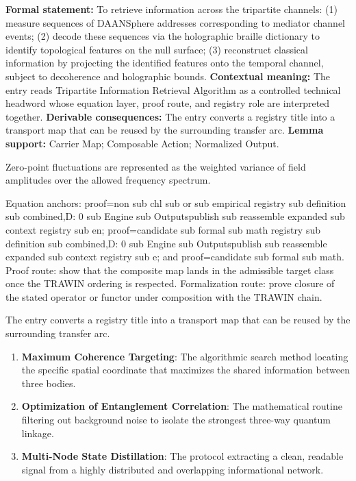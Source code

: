 \begingroup\footnotesize\setlength{\emergencystretch}{3em}\sloppy
\textbf{Formal statement:} To retrieve information across the tripartite channels: (1) measure sequences of DAANSphere addresses corresponding to mediator channel events; (2) decode these sequences via the holographic braille dictionary to identify topological features on the null surface; (3) reconstruct classical information by projecting the identified features onto the temporal channel, subject to decoherence and holographic bounds. \textbf{Contextual meaning:} The entry reads Tripartite Information Retrieval Algorithm as a controlled technical headword whose equation layer, proof route, and registry role are interpreted together. \textbf{Derivable consequences:} The entry converts a registry title into a transport map that can be reused by the surrounding transfer arc. \textbf{Lemma support:} Carrier Map; Composable Action; Normalized Output.\par
\endgroup

Zero-point fluctuations are represented as the weighted variance of field amplitudes over the allowed frequency spectrum.

Equation anchors: proof=non sub chl sub or sub empirical registry sub definition sub combined,D: 0 sub Engine sub Outputspublish sub reassemble expanded sub context registry sub en; proof=candidate sub formal sub math registry sub definition sub combined,D: 0 sub Engine sub Outputspublish sub reassemble expanded sub context registry sub e; and proof=candidate sub formal sub math. Proof route: show that the composite map lands in the admissible target class once the TRAWIN ordering is respected. Formalization route: prove closure of the stated operator or functor under composition with the TRAWIN chain.

The entry converts a registry title into a transport map that can be reused by the surrounding transfer arc.
\endgroup

\begin{enumerate}[leftmargin=1.6em,itemsep=6pt,topsep=4pt]
\item \textbf{Maximum Coherence Targeting}: The algorithmic search method locating the specific spatial coordinate that maximizes the shared information between three bodies.
\item \textbf{Optimization of Entanglement Correlation}: The mathematical routine filtering out background noise to isolate the strongest three-way quantum linkage.
\item \textbf{Multi-Node State Distillation}: The protocol extracting a clean, readable signal from a highly distributed and overlapping informational network.
\end{enumerate}

